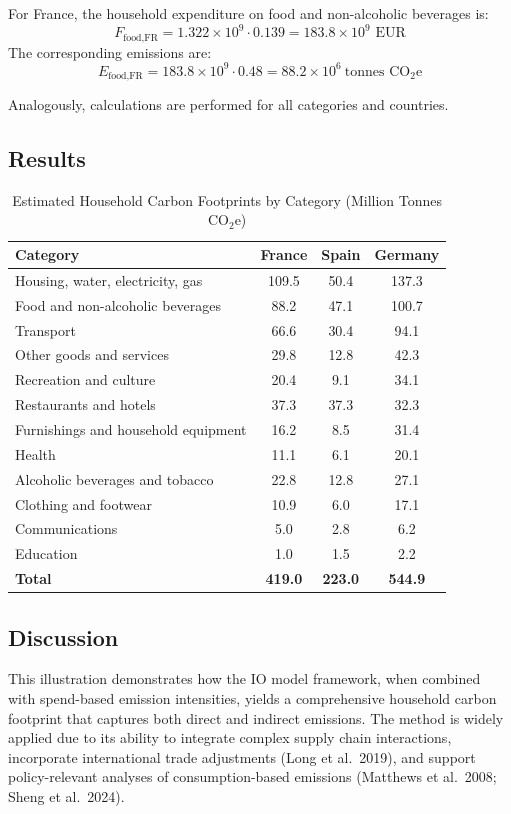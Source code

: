 \documentclass[12pt,a4paper]{article}%
\begin{document}
For France, the household expenditure on food and non-alcoholic beverages is:
\[
F_{\text{food,FR}} = 1.322 \times 10^9 \cdot 0.139 = 183.8 \times 10^9 \text{ EUR}
\]
The corresponding emissions are:
\[
E_{\text{food,FR}} = 183.8 \times 10^9 \cdot 0.48 = 88.2 \times 10^6 \ \text{tonnes CO}_{2}\text{e}
\]

Analogously, calculations are performed for all categories and countries.

\subsection{Results}

\begin{table}[h]
\centering
\caption{Estimated Household Carbon Footprints by Category (Million Tonnes CO$_{2}$e)}\label{tab:results}
\begin{tabular}{@{}lccc@{}}
\toprule
\textbf{Category} & \textbf{France} & \textbf{Spain} & \textbf{Germany}\\
\midrule
Housing, water, electricity, gas & 109.5 & 50.4 & 137.3\\
Food and non-alcoholic beverages & 88.2 & 47.1 & 100.7\\
Transport & 66.6 & 30.4 & 94.1\\
Other goods and services & 29.8 & 12.8 & 42.3\\
Recreation and culture & 20.4 & 9.1 & 34.1\\
Restaurants and hotels & 37.3 & 37.3 & 32.3\\
Furnishings and household equipment & 16.2 & 8.5 & 31.4\\
Health & 11.1 & 6.1 & 20.1\\
Alcoholic beverages and tobacco & 22.8 & 12.8 & 27.1\\
Clothing and footwear & 10.9 & 6.0 & 17.1\\
Communications & 5.0 & 2.8 & 6.2\\
Education & 1.0 & 1.5 & 2.2\\
\midrule
\textbf{Total} & \textbf{419.0} & \textbf{223.0} & \textbf{544.9}\\
\bottomrule
\end{tabular}
\end{table}

\subsection{Discussion}

This illustration demonstrates how the IO model framework, when combined with spend-based emission intensities, yields a comprehensive household carbon footprint that captures both direct and indirect emissions. The method is widely applied due to its ability to integrate complex supply chain interactions, incorporate international trade adjustments (Long et al.~2019), and support policy-relevant analyses of consumption-based emissions (Matthews et al.~2008; Sheng et al.~2024).
\end{document}
